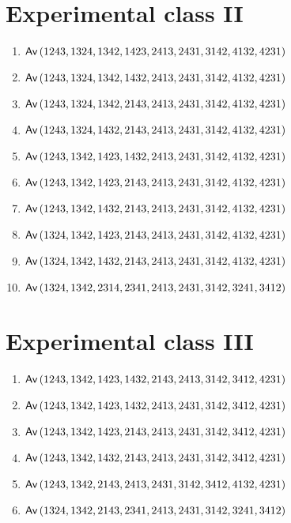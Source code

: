\section{Experimental class II}
\begin{enumerate}
\item $\textsf{Av}\left(1243,1324,1342,1423,2413,2431,3142,4132,4231\right)$
\item $\textsf{Av}\left(1243,1324,1342,1432,2413,2431,3142,4132,4231\right)$
\item $\textsf{Av}\left(1243,1324,1342,2143,2413,2431,3142,4132,4231\right)$
\item $\textsf{Av}\left(1243,1324,1432,2143,2413,2431,3142,4132,4231\right)$
\item $\textsf{Av}\left(1243,1342,1423,1432,2413,2431,3142,4132,4231\right)$
\item $\textsf{Av}\left(1243,1342,1423,2143,2413,2431,3142,4132,4231\right)$
\item $\textsf{Av}\left(1243,1342,1432,2143,2413,2431,3142,4132,4231\right)$
\item $\textsf{Av}\left(1324,1342,1423,2143,2413,2431,3142,4132,4231\right)$
\item $\textsf{Av}\left(1324,1342,1432,2143,2413,2431,3142,4132,4231\right)$
\item $\textsf{Av}\left(1324,1342,2314,2341,2413,2431,3142,3241,3412\right)$
\end{enumerate}

\section{Experimental class III}
\begin{enumerate}
\item $\textsf{Av}\left(1243,1342,1423,1432,2143,2413,3142,3412,4231\right)$
\item $\textsf{Av}\left(1243,1342,1423,1432,2413,2431,3142,3412,4231\right)$
\item $\textsf{Av}\left(1243,1342,1423,2143,2413,2431,3142,3412,4231\right)$
\item $\textsf{Av}\left(1243,1342,1432,2143,2413,2431,3142,3412,4231\right)$
\item $\textsf{Av}\left(1243,1342,2143,2413,2431,3142,3412,4132,4231\right)$
\item $\textsf{Av}\left(1324,1342,2143,2341,2413,2431,3142,3241,3412\right)$
\end{enumerate}

